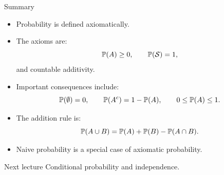 \begin{frame}{Summary}
\begin{itemize}
    \item Probability is defined axiomatically.

    \item The axioms are:
    \[
    \mathbb{P}(A)\geq0,
    \qquad
    \mathbb{P}(\mathcal{S})=1,
    \]
    and countable additivity.

    \item Important consequences include:
    \[
    \mathbb{P}(\emptyset)=0,
    \qquad
    \mathbb{P}(A^c)=1-\mathbb{P}(A),
    \qquad 
    0\leq\mathbb{P}(A)\leq1.
    \]

    \item The addition rule is:
    \[
    \mathbb{P}(A\cup B)
    =
    \mathbb{P}(A)+\mathbb{P}(B)-\mathbb{P}(A\cap B).
    \]

    \item Naive probability is a special case of axiomatic probability.
\end{itemize}

\vspace{0.25cm}

\begin{keybox}{Next lecture}
Conditional probability and independence.
\end{keybox}
\end{frame}